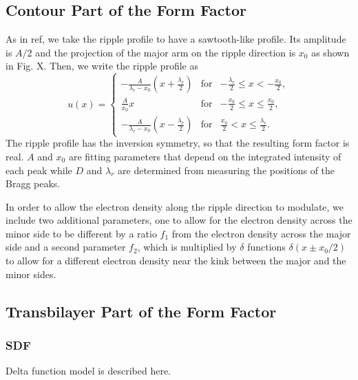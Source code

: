 \subsection{Contour Part of the Form Factor}
As in ref, we take the ripple profile to have a sawtooth-like profile. Its
amplitude is  $A/2$ and the projection of the major arm on the 
ripple direction is $x_0$ as shown in Fig. X. Then, we write the ripple 
profile as
\begin{equation}
  u(x) = \left\{
    \begin{array}{ccc}
    -\frac{A}{\lambda_r-x_0}\left(x+\frac{\lambda_r}{2}\right) 
      & \text{for} 
      & -\frac{\lambda_r}{2} \leq x < -\frac{x_0}{2}, \\
    \frac{A}{x_0}x 
      & \text{for} 
      & -\frac{x_0}{2} \leq x \leq \frac{x_0}{2}, \\
    -\frac{A}{\lambda_r-x_0} \left(x-\frac{\lambda_r}{2}\right)
      & \text{for} 
      & \frac{x_0}{2} < x \leq \frac{\lambda_r}{2}.
    \end{array} \right.
\end{equation}
The ripple profile has the inversion symmetry, so that the resulting
form factor is real. $A$ and $x_0$ are fitting parameters that depend 
on the integrated intensity of each peak while $D$ and $\lambda_r$ are
determined from measuring the positions of the Bragg peaks.

In order to allow the electron density along the ripple direction to 
modulate, we include two additional parameters, one to allow for the electron
density across the minor side to be different by a ratio $f_1$ from the 
electron density across the major side and a second parameter $f_2$, which
is multiplied by $\delta$ functions $\delta(x \pm x_0/2)$ to allow for 
a different electron density near the kink between the major and the minor
sides. 


\subsection{Transbilayer Part of the Form Factor}
\subsubsection{SDF}
Delta function model is described here.

